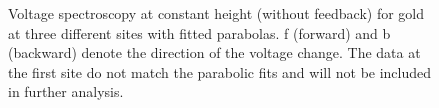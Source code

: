 \documentclass[a4paper]{scrartcl}
\numberwithin{equation}{section}
\numberwithin{figure}{section}
\numberwithin{table}{section}
\begin{document}
\begin{figure}[!h]
\hfill
{}
\caption{\small Voltage spectroscopy at constant height (without feedback) for gold at three different sites with fitted parabolas. f (forward) and b (backward) denote the direction of the voltage change. The data at the first site do not match the parabolic fits and will not be included in further analysis.}
\label{fig:parabolasgold}
\end{figure}
\end{document}
